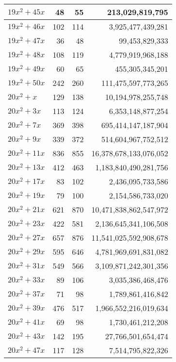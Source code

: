 \documentclass[a4paper]{amsproc}
\theoremstyle{plain}
\theoremstyle{named}
\begin{document}
\begin{longtable}{ | l | r | r | r | }
$19x^2 + 45x$ & 48 & 55 & 213{,}029{,}819{,}795 \\ \hline
$19x^2 + 46x$ & 102 & 114 & 3{,}925{,}477{,}439{,}281 \\ \hline
$19x^2 + 47x$ & 36 & 48 & 99{,}453{,}829{,}333 \\ \hline
$19x^2 + 48x$ & 108 & 119 & 4{,}779{,}919{,}968{,}188 \\ \hline
$19x^2 + 49x$ & 60 & 65 & 455{,}305{,}345{,}201 \\ \hline
$19x^2 + 50x$ & 242 & 260 & 111{,}475{,}597{,}773{,}265 \\ \hline
$20x^2 + x$ & 129 & 138 & 10{,}194{,}978{,}255{,}748 \\ \hline
$20x^2 + 3x$ & 113 & 124 & 6{,}353{,}148{,}877{,}254 \\ \hline
$20x^2 + 7x$ & 369 & 398 & 695{,}414{,}147{,}187{,}904 \\ \hline
$20x^2 + 9x$ & 339 & 372 & 514{,}604{,}967{,}752{,}512 \\ \hline
$20x^2 + 11x$ & 836 & 855 & 16{,}378{,}678{,}133{,}076{,}052 \\ \hline
$20x^2 + 13x$ & 412 & 463 & 1{,}183{,}840{,}490{,}281{,}756 \\ \hline
$20x^2 + 17x$ & 83 & 102 & 2{,}436{,}095{,}733{,}586 \\ \hline
$20x^2 + 19x$ & 79 & 100 & 2{,}154{,}586{,}733{,}020 \\ \hline
$20x^2 + 21x$ & 621 & 870 & 10{,}471{,}838{,}862{,}547{,}972 \\ \hline
$20x^2 + 23x$ & 422 & 581 & 2{,}136{,}645{,}341{,}106{,}508 \\ \hline
$20x^2 + 27x$ & 657 & 876 & 11{,}541{,}025{,}592{,}908{,}678 \\ \hline
$20x^2 + 29x$ & 595 & 646 & 4{,}781{,}969{,}691{,}831{,}082 \\ \hline
$20x^2 + 31x$ & 549 & 566 & 3{,}109{,}871{,}242{,}301{,}356 \\ \hline
$20x^2 + 33x$ & 89 & 106 & 3{,}035{,}386{,}468{,}476 \\ \hline
$20x^2 + 37x$ & 71 & 98 & 1{,}789{,}861{,}416{,}842 \\ \hline
$20x^2 + 39x$ & 476 & 517 & 1{,}966{,}552{,}216{,}019{,}634 \\ \hline
$20x^2 + 41x$ & 69 & 98 & 1{,}730{,}461{,}212{,}208 \\ \hline
$20x^2 + 43x$ & 142 & 195 & 27{,}766{,}501{,}654{,}474 \\ \hline
$20x^2 + 47x$ & 117 & 128 & 7{,}514{,}795{,}822{,}326 \\ \hline

\end{longtable}
\end{document}
